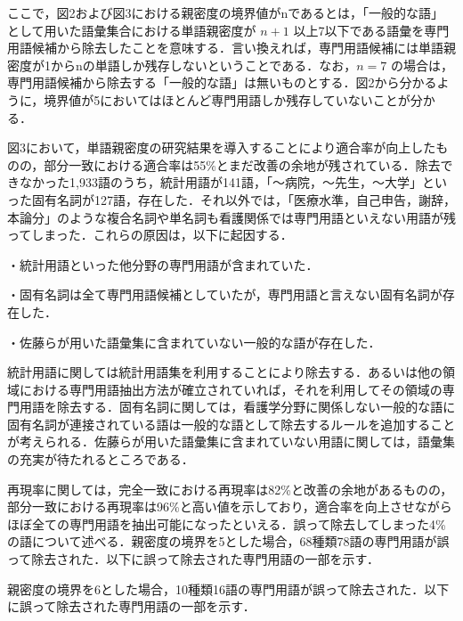 \documentclass[japanese]{jnlp_1.4}
\begin{document}
ここで，図2および図3における親密度の境界値がnであるとは，「一般的な語」として用いた語彙集合における単語親密度が $n+1$ 以上7以下である語彙を専門用語候補から除去したことを意味する．言い換えれば，専門用語候補には単語親密度が1からnの単語しか残存しないということである．なお，$n=7$ の場合は，専門用語候補から除去する「一般的な語」は無いものとする．図2から分かるように，境界値が5においてはほとんど専門用語しか残存していないことが分かる．

図3において，単語親密度の研究結果を導入することにより適合率が向上したものの，部分一致における適合率は55{\%}とまだ改善の余地が残されている．除去できなかった1,933語のうち，統計用語が141語，「〜病院，〜先生，〜大学」といった固有名詞が127語，存在した．それ以外では，「医療水準，自己申告，謝辞，本論分」のような複合名詞や単名詞も看護関係では専門用語といえない用語が残ってしまった．これらの原因は，以下に起因する．

・統計用語といった他分野の専門用語が含まれていた．

・固有名詞は全て専門用語候補としていたが，専門用語と言えない固有名詞が存在した．

・佐藤らが用いた語彙集に含まれていない一般的な語が存在した．

統計用語に関しては統計用語集を利用することにより除去する．あるいは他の領域における専門用語抽出方法が確立されていれば，それを利用してその領域の専門用語を除去する．固有名詞に関しては，看護学分野に関係しない一般的な語に固有名詞が連接されている語は一般的な語として除去するルールを追加することが考えられる．佐藤らが用いた語彙集に含まれていない用語に関しては，語彙集の充実が待たれるところである．

再現率に関しては，完全一致における再現率は82{\%}と改善の余地があるものの，部分一致における再現率は96{\%}と高い値を示しており，適合率を向上させながらほぼ全ての専門用語を抽出可能になったといえる．誤って除去してしまった4{\%}の語について述べる．親密度の境界を5とした場合，68種類78語の専門用語が誤って除去された．以下に誤って除去された専門用語の一部を示す．

\vspace{1zw}
\vspace{1zw}

親密度の境界を6とした場合，10種類16語の専門用語が誤って除去された．以下に誤って除去された専門用語の一部を示す．

\vspace{1zw}
\vspace{1zw}
\end{document}
